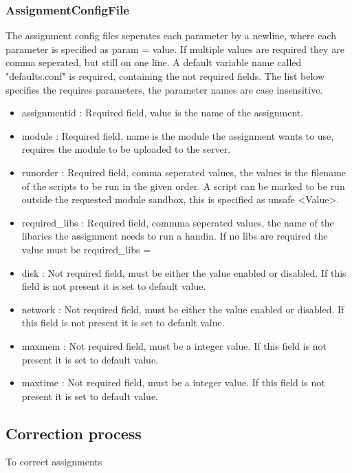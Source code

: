 \subsubsection{AssignmentConfigFile}
\label{sec:assignment}
The assignment config files seperates each parameter by a newline, where each parameter is specified as param = value. If multiple values are required they are comma seperated, but still on one line. A default variable name called "defaults.conf" is required, containing the not required fields.
The list below specifies the requires parameters, the parameter names are case insensitive.
\begin{itemize}
    \item assignmentid : Required field, value is the name of the assignment.
    \item module : Required field, name is the module the assignment wants to use, requires the module to be uploaded to the server.
    \item runorder : Required field, comma seperated values, the values is the filename of the scripts to be run in the given order. A script can be marked to be run outside the requested module sandbox, this is specified as unsafe <Value>.
    \item required\_libs : Required field, commma seperated values, the name of the libaries the assignment needs to run a handin. If no libs are required the value must be required\_libs =
    \item disk : Not required field, must be either the value enabled or disabled. If this field is not present it is set to default value.
    \item network : Not required field, must be either the value enabled or disabled. If this field is not present it is set to default value.
    \item maxmem : Not required field, must be a integer value. If this field is not present it is set to default value.
    \item maxtime : Not required field, must be a integer value. If this field is not present it is set to default value.
\end{itemize}



\subsection{Correction process}
To correct assignments

